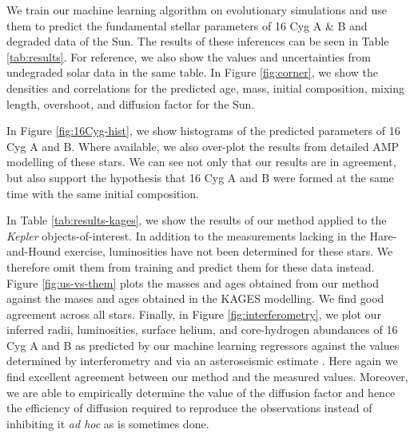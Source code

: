 \documentclass[manuscript]{aastex}
\begin{document}
We train our machine learning algorithm on evolutionary simulations and use them to predict the fundamental stellar parameters of 16 Cyg A \& B and degraded data of the Sun. The results of these inferences can be seen in Table \ref{tab:results}. For reference, we also show the values and uncertainties from undegraded solar data in the same table. In Figure \ref{fig:corner}, we show the densities and correlations for the predicted age, mass, initial composition, mixing length, overshoot, and diffusion factor for the Sun. 

In Figure \ref{fig:16Cyg-hist}, we show histograms of the predicted parameters of 16 Cyg A and B. Where available, we also over-plot the results from detailed AMP modelling \citep{2015ApJ...811L..37M} of these stars. We can see not only that our results are in agreement, but also support the hypothesis that 16 Cyg A and B were formed at the same time with the same initial composition. 


In Table \ref{tab:results-kages}, we show the results of our method applied to the \emph{Kepler} objects-of-interest. In addition to the measurements lacking in the Hare-and-Hound exercise, luminosities have not been determined for these stars. We therefore omit them from training and predict them for these data instead. Figure \ref{fig:us-vs-them} plots the masses and ages obtained from our method against the mases and ages obtained in the KAGES modelling. We find good agreement across all stars. Finally, in Figure \ref{fig:interferometry}, we plot our inferred radii, luminosities, surface helium, and core-hydrogen abundances of 16 Cyg A and B as predicted by our machine learning regressors against the values determined by interferometry \citep{2013MNRAS.433.1262W} and via an asteroseismic estimate \citep{2014ApJ...790..138V}. Here again we find excellent agreement between our method and the measured values. Moreover, we are able to empirically determine the value of the diffusion factor and hence the efficiency of diffusion required to reproduce the observations instead of inhibiting it \emph{ad hoc} as is sometimes done. 
\end{document}
